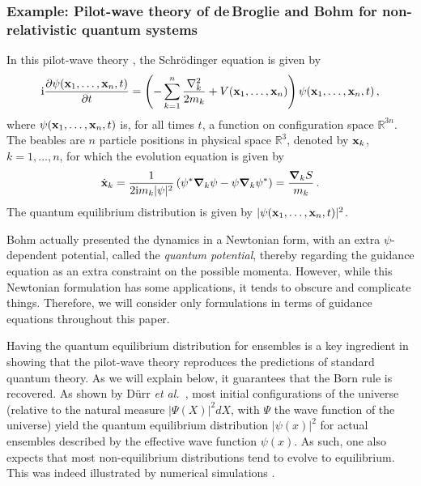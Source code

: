 \documentclass[12pt]{article}
\def\pa{\partial}
\def\ii{\textrm i}
\begin{document}
\subsubsection{Example: Pilot-wave theory of de$\,$Broglie and Bohm for non-relativistic quantum systems}\label{examplepilotwaveinterpretationnonrelativistic}
In this pilot-wave theory \cite{debroglie28,bohm52a,bohm52b}, the Schr{\"o}\-ding\-er equation is given by 
\begin{equation}
\ii  \frac{\partial \psi({\bf x}_1, \dots,{\bf x}_n,t)}{\pa t} =  \left( -\sum^n_{k=1} \frac{ \nabla^2_k}{2m_k} + V({\bf x}_1, \dots,{\bf x}_n) \right)  \psi({\bf x}_1, \dots,{\bf x}_n,t)\,,
\label{f.20.2}
\end{equation}
where $\psi({\bf x}_1,\dots,{\bf x}_n,t)$ is, for all times $t$, a function on configuration space ${\mathbb R}^{3n}$. The beables are $n$ particle positions in physical space ${\mathbb R}^3$, denoted by ${\bf x}_k$, $k=1,\dots,n$, for which the evolution equation is given by 
\begin{equation}
\dot{ {\bf x}}_k =  \frac{1}{2\ii m_k|\psi|^2}\left(\psi^* {\boldsymbol {\nabla}}_k \psi - \psi  {\boldsymbol {\nabla}}_k \psi^* \right) = \frac{{\boldsymbol{\nabla}}_k S}{m_k}  \,.
\label{f.20.3}
\end{equation}
The quantum equilibrium distribution is given by $|\psi({\bf x}_1,\dots,{\bf x}_n,t)|^2$. 

Bohm actually presented the dynamics in a Newtonian form, with an extra $\psi$-dependent potential, called the {\em quantum potential}, thereby regarding the guidance equation as an extra constraint on the possible momenta. However, while this Newtonian formulation has some applications, it tends to obscure and complicate things. Therefore, we will consider only formulations in terms of guidance equations throughout this paper.

Having the quantum equilibrium distribution for ensembles is a key ingredient in showing that the pilot-wave theory reproduces the predictions of standard quantum theory. As we will explain below, it guarantees that the Born rule is recovered. As shown by D\"urr {\em et al.}\ \cite{durr92}, most initial configurations of the universe (relative to the natural measure $|\Psi(X)|^2dX$, with $\Psi$ the wave function of the universe) yield the quantum equilibrium distribution $|\psi(x)|^2$ for actual ensembles described by the effective wave function $\psi(x)$. As such, one also expects that most non-equilibrium distributions tend to evolve to equilibrium. This was indeed illustrated by numerical simulations \cite{valentini05,colin10}. 
\end{document}
